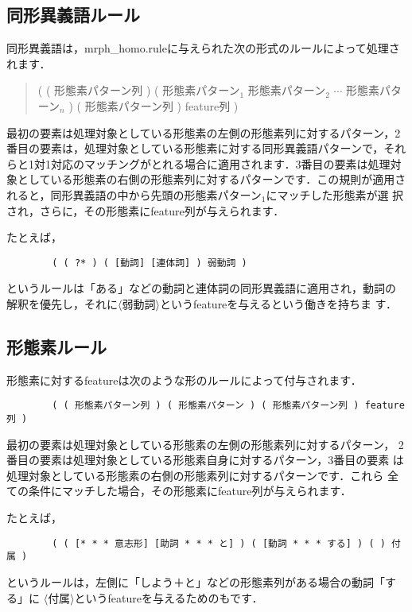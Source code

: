 \documentclass[a4j,11pt,titlepage]{jarticle}
\def\fl{$\langle$}
\def\fr{$\rangle$}
\begin{document}
\subsection{同形異義語ルール}

同形異義語は，mrph\_homo.ruleに与えられた次の形式のルールによって処理されます．
\begin{quote}
  ( ( 形態素パターン列 ) ( 形態素パターン$_1$ 形態素パターン$_2$ $\cdots$ 形態素パターン$_n$ ) 
  ( 形態素パターン列 ) feature列 )
\end{quote}
最初の要素は処理対象としている形態素の左側の形態素列に対するパターン，2 
番目の要素は，処理対象としている形態素に対する同形異義語パターンで，それ
らと1対1対応のマッチングがとれる場合に適用されます．3番目の要素は処理対
象としている形態素の右側の形態素列に対するパターンです．この規則が適用さ
れると，同形異義語の中から先頭の形態素パターン$_1$にマッチした形態素が選
択され，さらに，その形態素にfeature列が与えられます．

たとえば，
\begin{verbatim}
        ( ( ?* ) ( [動詞] [連体詞] ) 弱動詞 )  
\end{verbatim}
というルールは「ある」などの動詞と連体詞の同形異義語に適用され，動詞の
解釈を優先し，それに\fl 弱動詞\fr というfeatureを与えるという働きを持ちま
す．


\subsection{形態素ルール}

形態素に対するfeatureは次のような形のルールによって付与されます．
\begin{verbatim}
        ( ( 形態素パターン列 ) ( 形態素パターン ) ( 形態素パターン列 ) feature列 )
\end{verbatim}
最初の要素は処理対象としている形態素の左側の形態素列に対するパターン，
2番目の要素は処理対象としている形態素自身に対するパターン，3番目の要素
は処理対象としている形態素の右側の形態素列に対するパターンです．これら
全ての条件にマッチした場合，その形態素にfeature列が与えられます．

たとえば，
\begin{verbatim}
        ( ( [* * * 意志形] [助詞 * * * と] ) ( [動詞 * * * する] ) ( ) 付属 )
\end{verbatim}
というルールは，左側に「しよう＋と」などの形態素列がある場合の動詞「する」に
\fl 付属\fr というfeatureを与えるためのもです．
\end{document}
